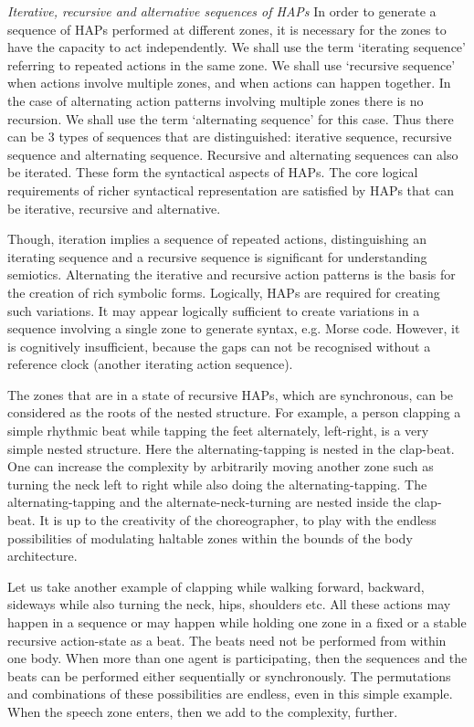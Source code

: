 {{{{{\emph{Iterative, recursive and alternative sequences of HAPs} In order to generate a sequence of HAPs performed at different zones, it is necessary for the zones to have the capacity to act independently. We shall use the term `iterating sequence' referring to repeated actions in the same zone. We shall use `recursive sequence' when actions involve multiple zones, and when actions can happen together. In the case of alternating action patterns involving multiple zones there is no recursion. We shall use the term `alternating sequence' for this case. Thus there can be 3 types of sequences that are distinguished:  iterative sequence, recursive sequence and alternating sequence. Recursive and alternating sequences can also be iterated. These form the syntactical aspects of HAPs. The core logical requirements of richer syntactical representation are satisfied by HAPs that can be iterative, recursive and alternative. 

Though, iteration implies a sequence of repeated actions, distinguishing an iterating sequence and a recursive sequence is significant for understanding semiotics. Alternating the iterative and recursive action patterns is the basis for the creation of rich symbolic forms. Logically, HAPs are required for creating such variations. It may appear logically sufficient to create variations in a sequence involving a single zone to generate syntax, e.g. Morse code.  However, it is cognitively insufficient, because the gaps can not be recognised without a reference clock (another iterating action sequence). 

The zones that are in a state of recursive HAPs, which are synchronous, can be considered as the roots of the nested structure. For example, a person clapping a simple rhythmic beat while tapping the feet alternately, left-right, is a very simple nested structure. Here the alternating-tapping is nested in the clap-beat. One can increase the complexity by arbitrarily moving another zone such as turning the neck left to right while also doing the alternating-tapping. The alternating-tapping and the alternate-neck-turning are nested inside the clap-beat. It is up to the creativity of the choreographer, to play with the endless possibilities of modulating haltable zones within the bounds of the body architecture. 

Let us take another example of clapping while walking forward, backward, sideways while also turning the neck, hips, shoulders etc. All these actions may happen in a sequence or may happen while holding one zone in a fixed or a stable recursive action-state as a beat. The beats need not be performed from within one body. When more than one agent is participating, then the sequences and the beats can be performed either sequentially or synchronously. The permutations and combinations of these possibilities are endless, even in this simple example. When the speech zone enters, then we add to the complexity, further. 

}}}}}
